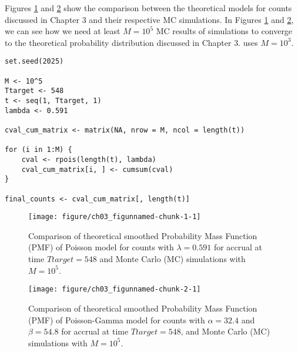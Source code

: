 Figures \ref{fig:3_1} and \ref{fig:3_2} show the comparison between the theoretical models for counts discussed in Chapter 3 and their respective MC simulations. In Figures \ref{fig:3_1} and \ref{fig:3_2}, we can see how we need at least $M=10^5$ MC results of simulations to converge to the theoretical probability distribution discussed in Chapter 3. \cite{carter2004application} uses $M = 10^3$.


\begin{knitrout}
\color{fgcolor}\begin{kframe}
\begin{verbatim}
set.seed(2025)

M <- 10^5
Ttarget <- 548
t <- seq(1, Ttarget, 1)
lambda <- 0.591

cval_cum_matrix <- matrix(NA, nrow = M, ncol = length(t))

for (i in 1:M) {
	cval <- rpois(length(t), lambda)
	cval_cum_matrix[i, ] <- cumsum(cval)
}

final_counts <- cval_cum_matrix[, length(t)]
\end{verbatim}
\end{kframe}
\end{knitrout}


\begin{figure}
\begin{knitrout}
\color{fgcolor}
\texttt{[image: figure/ch03\_figunnamed-chunk-1-1]} 
\end{knitrout}
  \caption{Comparison of theoretical smoothed Probability Mass Function (PMF) of Poisson model for counts with $\lambda = 0.591$ for accrual at time $Ttarget=548$ and Monte Carlo (MC) simulations with $M=10^5$.}
  \label{fig:3_1}
\end{figure}



\begin{figure}
\begin{knitrout}
\color{fgcolor}
\texttt{[image: figure/ch03\_figunnamed-chunk-2-1]} 
\end{knitrout}
\caption{Comparison of theoretical smoothed Probability Mass Function (PMF) of Poisson-Gamma model for counts with $\alpha = 32.4$ and $\beta = 54.8$ for accrual at time $Ttarget=548$, and Monte Carlo (MC) simulations with $M=10^5$.}
\label{fig:3_2}
\end{figure}

